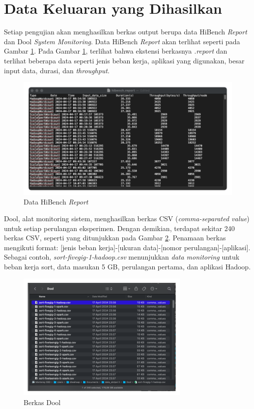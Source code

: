 \section{Data Keluaran yang Dihasilkan}

Setiap pengujian akan menghasilkan berkas output berupa data HiBench \textit{Report} dan Dool \textit{System Monitoring}. Data HiBench \textit{Report} akan terlihat seperti pada Gambar \ref{fig:data-hibench-report}. Pada Gambar \ref{fig:data-hibench-report}, terlihat bahwa ekstensi berkasnya \textit{.report} dan terlihat beberapa data seperti jenis beban kerja, aplikasi yang digunakan, besar input data, durasi, dan \textit{throughput}.

\begin{figure}[h]
    \centering
    \includegraphics[width=1\textwidth]{figures/ch04/data-hibench}
    \caption{Data HiBench \textit{Report}}
    \label{fig:data-hibench-report}
\end{figure}

Dool, alat monitoring sistem, menghasilkan berkas CSV (\textit{comma-separated value}) untuk setiap perulangan eksperimen. Dengan demikian, terdapat sekitar 240 berkas CSV, seperti yang ditunjukkan pada Gambar \ref{fig:data-dool-luar}. Penamaan berkas mengikuti format: [jenis beban kerja]-[ukuran data]-[nomor perulangan]-[aplikasi]. Sebagai contoh, \textit{sort-fivegig-1-hadoop.csv} menunjukkan \textit{data monitoring} untuk beban kerja sort, data masukan 5 GB, perulangan pertama, dan aplikasi Hadoop.

\begin{figure}[h]
    \centering
    \includegraphics[width=0.75\textwidth]{figures/ch04/data-dool-luar}
    \caption{Berkas Dool}
    \label{fig:data-dool-luar}
\end{figure}

